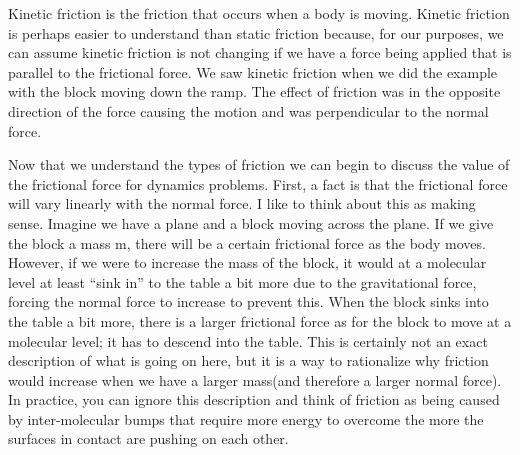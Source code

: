 Kinetic friction is the friction that occurs when a body is moving.  Kinetic friction is perhaps easier to understand than static friction because, for our purposes, we can assume kinetic friction is not changing if we have a force being applied that is parallel to the frictional force. We saw kinetic friction when we did the example with the block moving down the ramp. The effect of friction was in the opposite direction of the force causing the motion and was perpendicular to the normal force.

Now that we understand the types of friction we can begin to discuss the value of the frictional force for dynamics problems. First, a fact is that the frictional force will vary linearly with the normal force. I like to think about this as making sense. Imagine we have a plane and a block moving across the plane. If we give the block a mass m, there will be a certain frictional force as the body moves. However, if we were to increase the mass of the block, it would at a molecular level at least “sink in” to the table a bit more due to the gravitational force, forcing the normal force to increase to prevent this. When the block sinks into the table a bit more, there is a larger frictional force as for the block to move at a molecular level; it has to descend into the table. This is certainly not an exact description of what is going on here, but it is a way to rationalize why friction would increase when we have a larger mass(and therefore a larger normal force). In practice, you can ignore this description and think of friction as being caused by inter-molecular bumps that require more energy to overcome the more the surfaces in contact are pushing on each other. 

